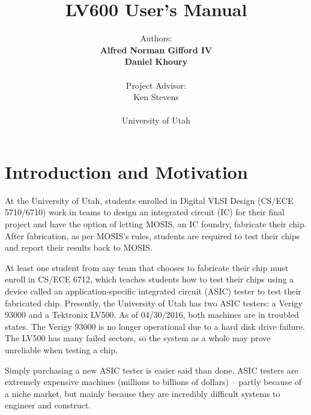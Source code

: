 \documentclass[letterpaper, 10 pt]{report}
\begin{document}
\title{LV600 User's Manual}
\author{Authors: \\ \textbf{Alfred Norman Gifford IV} \\ \textbf{Daniel Khoury} \\ \\ Project Advisor: \\ Ken Stevens \\ \\ University of Utah}
\maketitle
\pagestyle{empty}

\tableofcontents
\newpage

\section{Introduction and Motivation}
At the University of Utah, students enrolled in Digital VLSI Design (CS/ECE 5710/6710) work in teams to design an integrated circuit (IC) for their final project and have the option of letting MOSIS, an IC foundry, fabricate their chip. After fabrication, as per MOSIS's rules, students are required to test their chips and report their results back to MOSIS. 

At least one student from any team that chooses to fabricate their chip must enroll in CS/ECE 6712, which teaches students how to test their chips using a device called an application-specific integrated circuit (ASIC) tester to test their fabricated chip. Presently, the University of Utah has two ASIC testers: a Verigy 93000 and a Tektronix LV500. As of 04/30/2016, both machines are in troubled states. The Verigy 93000 is no longer operational due to a hard disk drive failure. The LV500 has many failed sectors, so the system as a whole may prove unreliable when testing a chip. 

Simply purchasing a new ASIC tester is easier said than done. ASIC testers are extremely expensive machines (millions to billions of dollars) --  partly because of a niche market, but mainly because they are incredibly difficult systems to engineer and construct. 
\end{document}
